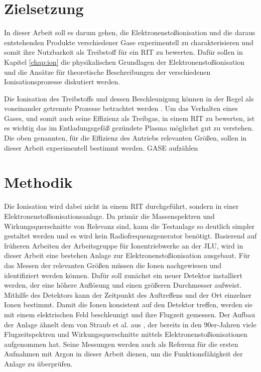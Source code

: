 \section{Zielsetzung}
In dieser Arbeit soll es darum gehen, die Elektronenstoßionisation und die daraus entstehenden Produkte verschiedener Gase experimentell zu charakterisieren und somit ihre Nutzbarkeit als Treibstoff für ein RIT zu bewerten. Dafür sollen in Kapitel \ref{chap:ion} die physikalischen Grundlagen der Elektronenstoßionisation und die Ansätze für theoretische Beschreibungen der verschiedenen Ionisationsprozesse diskutiert werden.

Die Ionisation des Treibstoffs und dessen Beschleunigung können in der Regel als voneinander getrennte Prozesse betrachtet werden \cite{ion}. Um das Verhalten eines Gases, und somit auch seine Effizienz als Treibgas, in einem RIT zu bewerten, ist es wichtig das im Entladungsgefäß gezündete Plasma möglichst gut zu verstehen. Die oben genannten, für die Effizienz des Antriebs relevanten Größen, sollen in dieser Arbeit experimentell bestimmt werden. GASE aufzählen

\section{Methodik} 
Die Ionisation wird dabei nicht in einem RIT durchgeführt, sondern in einer Elektronenstoßionisationsanlage. Da primär die Massenspektren und Wirkungsquerschnitte von Relevanz sind, kann die Testanlage so deutlich simpler gestaltet werden und es wird kein Radiofrequenzgenerator benötigt. Basierend auf früheren Arbeiten der Arbeitsgruppe für Ionentriebwerke an der JLU, wird in dieser Arbeit eine bestehen Anlage zur Elektronenstoßionisation ausgebaut. Für das Messen der relevanten Größen müssen die Ionen nachgewiesen und identifiziert werden können. Dafür soll zunächst ein neuer Detektor installiert werden, der eine höhere Auflösung und einen größeren Durchmesser aufweist. Mithilfe des Detektors kann der Zeitpunkt des Auftreffens und der Ort einzelner Ionen bestimmt. Damit die Ionen konsistent auf den Detektor treffen, werden sie mit einem elektrischen Feld beschleunigt und ihre Flugzeit gemessen. Der Aufbau der Anlage ähnelt dem von Straub et al. aus \cite{Straub}, der bereits in den 90er-Jahren viele Flugzeitspektren und Wirkungsquerschnitte mittels Elektronenstoßionisationen aufgenommen hat. Seine Messungen werden auch als Referenz für die ersten Aufnahmen mit Argon in dieser Arbeit dienen, um die Funktionsfähigkeit der Anlage zu überprüfen.

